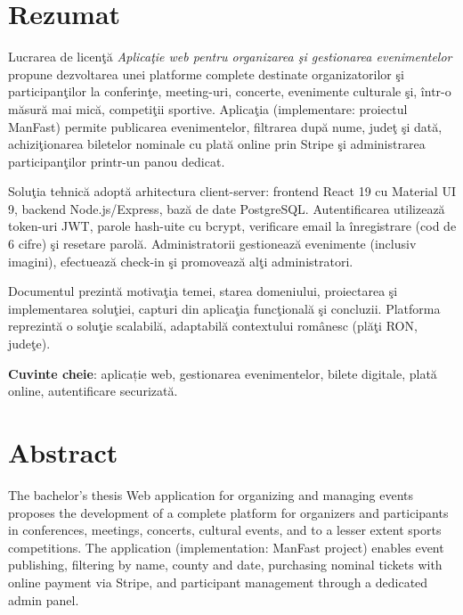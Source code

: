 \chapter*{Rezumat}

Lucrarea de licen\c t\u a \emph{Aplica\c tie web pentru organizarea \c si gestionarea evenimentelor} propune dezvoltarea unei platforme complete destinate organizatorilor \c si participan\c tilor la conferin\c te, meeting-uri, concerte, evenimente culturale \c si, \^intr-o m\u asur\u a mai mic\u a, competi\c tii sportive. Aplica\c tia (implementare: proiectul ManFast) permite publicarea evenimentelor, filtrarea dup\u a nume, jude\c t \c si dat\u a, achizi\c tionarea biletelor nominale cu plat\u a online prin Stripe \c si administrarea participan\c tilor printr-un panou dedicat.

Solu\c tia tehnic\u a adopt\u a arhitectura client-server: frontend React 19 cu Material UI 9, backend Node.js/Express, baz\u a de date PostgreSQL. Autentificarea utilizeaz\u a token-uri JWT, parole hash-uite cu bcrypt, verificare email la \^inregistrare (cod de 6 cifre) \c si resetare parol\u a. Administratorii gestioneaz\u a evenimente (inclusiv imagini), efectueaz\u a check-in \c si promoveaz\u a al\c ti administratori.

Documentul prezint\u a motiva\c tia temei, starea domeniului, proiectarea \c si implementarea solu\c tiei, capturi din aplica\c tia func\c tional\u a \c si concluzii. Platforma reprezint\u a o solu\c tie scalabil\u a, adaptabil\u a contextului rom\^anesc (pl\u a\c ti RON, jude\c te).

\textbf{Cuvinte cheie}: aplicație web, gestionarea evenimentelor, bilete digitale, plată online, autentificare securizată.

\vspace{1cm}
\chapter*{Abstract}

The bachelor's thesis Web application for organizing and managing events proposes the development of a complete platform for organizers and participants in conferences, meetings, concerts, cultural events, and to a lesser extent sports competitions. The application (implementation: ManFast project) enables event publishing, filtering by name, county and date, purchasing nominal tickets with online payment via Stripe, and participant management through a dedicated admin panel.

